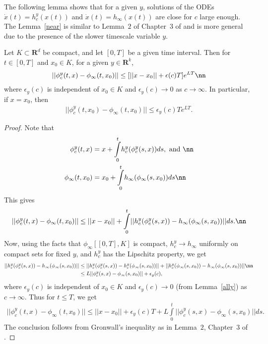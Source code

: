 The following lemma shows that for a given $y$, solutions of the ODEs $\dot{x}(t)=h^y_c(x(t))$ and $\dot{x}(t)=h_\infty(x(t))$ are close for $c$ large enough. The Lemma~\ref{near} is similar to Lemma~$2$ of Chapter~$3$ of \cite{SA} and is more general due to the presence of the slower timescale variable $y$.
\begin{lemma}\label{near}
Let $K \subset \mathbf{R}^d$ be compact, and let $[0,T]$ be a given time interval. Then for $t \in [0,T]$ and $x_0 \in K$, for a given $y \in \mathbf{R}^k$,
\begin{align}
||\phi^y_c(t,x)-\phi_\infty(t,x_0)||\leq [||x-x_0||+\epsilon(c)T]e^{LT}\nn
\end{align}
where $\epsilon_y(c)$ is independent of $x_0 \in K$  and $\epsilon_y(c) \rightarrow 0$ as $c \rightarrow \infty$. In particular, if $x=x_0$, then
\begin{align}\label{growth}
||\phi^y_c(t,x_0)-\phi_\infty(t,x_0)||\leq \epsilon_y(c)Te^{LT}.
\end{align}
\end{lemma}
\begin{proof}
Note that
\begin{align}
\phi^y_c(t,x)&=x+\overset{t}{\underset{0}{\int}} h^y_c(\phi^y_c(s,x))ds, \text{~and~}\nn\\
\phi_\infty(t,x_0)&=x_0+\overset{t}{\underset{0}{\int}} h_\infty(\phi_\infty(s,x_0))ds\nn
\end{align}
This gives
\begin{align}
||\phi^y_c(t,x)-\phi_\infty(t,x_0)|| \leq ||x-x_0||+\overset{t}{\underset{0}{\int}}||h^y_c(\phi^y_c(s,x))-h_\infty(\phi_\infty(s,x_0))||ds.\nn
\end{align}
Now, using the facts that $\phi_\infty[[0,T],K]$ is compact, $h^y_c \rightarrow h_\infty$ uniformly on compact sets for fixed $y$, and $h^y_c$ has the Lipschitz property, we get
\begin{align}
||h^y_c(\phi^y_c(s,x))-h_\infty(\phi_\infty(s,x_0))||	 &\leq ||h^y_c(\phi^y_c(s,x))-h^y_c(\phi_\infty(s,x_0))||+||h^y_c(\phi_\infty(s,x_0))-h_\infty(\phi_\infty(s,x_0))||\nn\\
							 &\leq L||\phi^y_c(s,x)-\phi_\infty(s,x_0)||+\epsilon_y(c),
\end{align}
where $\epsilon_y(c)$ is independent of $x_0 \in K$ and $\epsilon_y(c) \rightarrow 0$ (from Lemma~\ref{ally}) as $c \rightarrow \infty$. Thus for $t \leq T$, we get
\begin{align}\label{growtheq}
||\phi^y_c(t,x)-\phi_\infty(t,x_0)||\leq||x-x_0||+\epsilon_y(c)T+L\overset{t}{\underset{0}{\int}}||\phi^y_c(s,x)-\phi_\infty(s,x_0)||ds.
\end{align}
The conclusion follows from Gronwall's inequality as in Lemma~$2$, Chapter~$3$ of \cite{SA}.
\end{proof}
